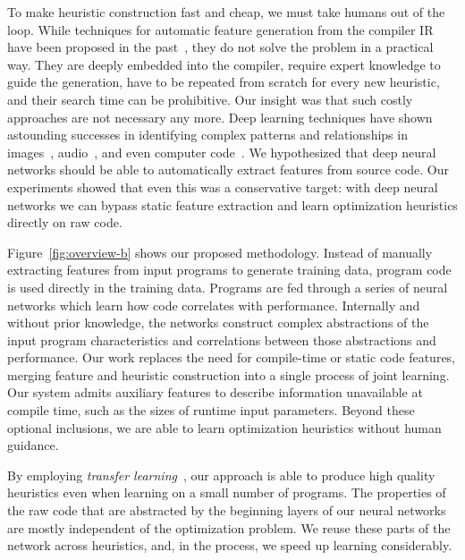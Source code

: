 To make heuristic construction fast and cheap, we must take humans out of the loop. While techniques for automatic feature generation from the compiler IR have been proposed in the past~\cite{Namolaru2010a,Leather2014}, they do not solve the problem in a practical way. They are deeply embedded into the compiler, require expert knowledge to guide the generation, have to be repeated from scratch for every new heuristic, and their search time can be prohibitive. Our insight was that such costly approaches are not necessary any more. Deep learning techniques have shown astounding successes in identifying complex patterns and relationships in images~\cite{Krizhevsky2012,He2016}, audio~\cite{Lee2009b}, and even computer code~\cite{Allamanis2014,Allamanis2014a}. We hypothesized that deep neural networks should be able to automatically extract features from source code. Our experiments showed that even this was a conservative target: with deep neural networks we can bypass static feature extraction and learn optimization heuristics directly on raw code.



Figure~\ref{fig:overview-b} shows our proposed methodology. Instead of manually extracting features from input programs to generate training data, program code is used directly in the training data. Programs are fed through a series of neural networks which learn how code correlates with performance. Internally and without prior knowledge, the networks construct complex abstractions of the input program characteristics and correlations between those abstractions and performance. Our work replaces the need for compile-time or static code features, merging feature and heuristic construction into a single process of joint learning. Our system admits auxiliary features to describe information unavailable at compile time, such as the sizes of runtime input parameters. Beyond these optional inclusions, we are able to learn optimization heuristics without human guidance.

By employing \emph{transfer learning}~\cite{Yosinski2014}, our approach is able to produce high quality heuristics even when learning on a small number of programs. The properties of the raw code that are abstracted by the beginning layers of our neural networks are mostly independent of the optimization problem. We reuse these parts of the network across heuristics, and, in the process, we speed up learning considerably.

